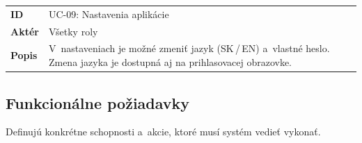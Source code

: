 \vspace{6pt}\noindent
\begin{tabularx}{\textwidth}{@{}l X@{}}
      \toprule
      \textbf{ID}    & UC-09: Nastavenia aplikácie                                                                                               \\
      \textbf{Aktér} & Všetky roly                                                                                                               \\
      \textbf{Popis} & V~nastaveniach je možné zmeniť jazyk (SK\,/\,EN) a~vlastné heslo. Zmena jazyka je dostupná aj na prihlasovacej obrazovke. \\
      \bottomrule
\end{tabularx}

\subsection{Funkcionálne požiadavky}
Definujú konkrétne schopnosti a~akcie, ktoré musí systém vedieť vykonať.

